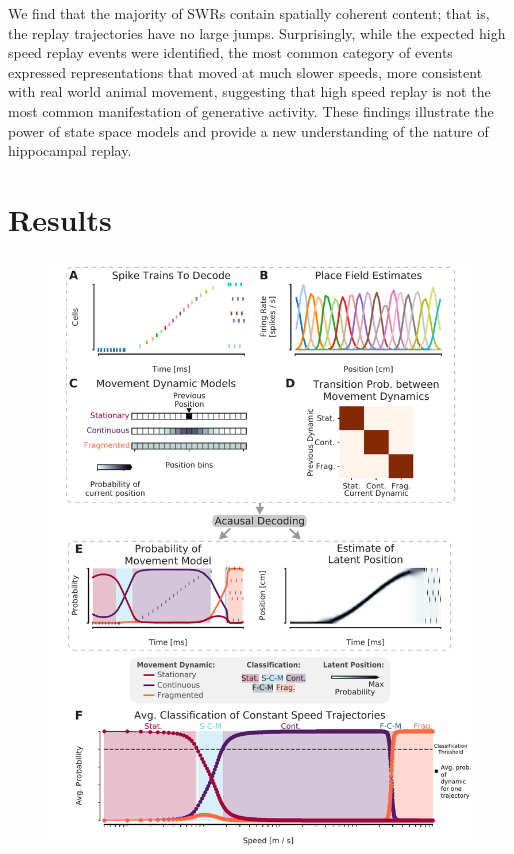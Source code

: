 \documentclass[times, twoside]{zHenriquesLab-StyleBioRxiv}
\begin{document}
We find that the majority of SWRs contain spatially coherent content; that is, the replay trajectories have no large jumps. Surprisingly, while the expected high speed replay events were identified, the most common category of events expressed representations that moved at much slower speeds, more consistent with real world animal movement, suggesting that high speed replay is not the most common manifestation of generative activity. These findings illustrate the power of state space models and provide a new understanding of the nature of hippocampal replay.

\section*{Results}
\begin{figure}%
\centering
\includegraphics[width=0.80\linewidth]{figures/Figure1/Figure1_v6}

\end{figure}
\end{document}
